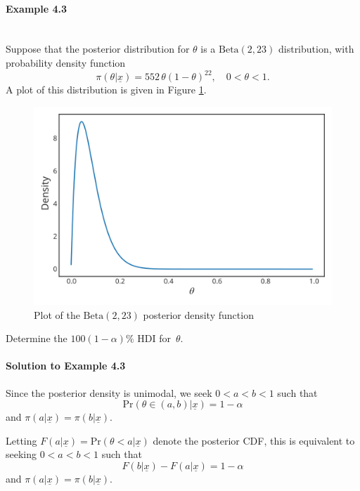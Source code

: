 \paragraph{Example 4.3}{~\\
Suppose that the posterior distribution for $\theta$ is a
\label{ex:hdi}
$\text{Beta}(2,23)$ distribution, with probability density function
$$
\pi(\theta|\underline{x})=552\,\theta(1-\theta)^{22}, \quad 0<\theta<1.
$$
A plot of this distribution is given in Figure \ref{fig:ci2}.
\begin{figure}[h!]

\includegraphics{images/betaposterior2.svg}
\caption{Plot of the $\text{Beta}(2,23)$ posterior density function}
\label{fig:ci2}

\end{figure}
Determine the $100(1-\alpha)\%$ HDI for~$\theta$.

\paragraph{Solution to Example 4.3}{
    
    Since the posterior density is unimodal, we seek $ 0 < a < b < 1 $ such that
    $$ \text{Pr}(\theta \in (a,b)|\underline{x}) = 1 - \alpha $$
    and $\pi(a|\underline{x}) = \pi(b|\underline{x})$.
    
    Letting $F(a|\underline{x}) = \text{Pr}(\theta < a|\underline{x})$ denote the posterior CDF, this is equivalent to  seeking $0<a<b<1$ such that
    $$ F(b|\underline{x}) - F(a|\underline{x}) = 1 - \alpha$$
    and $\pi(a|\underline{x}) = \pi(b|\underline{x})$.
    
    
}
\clearpage

}
